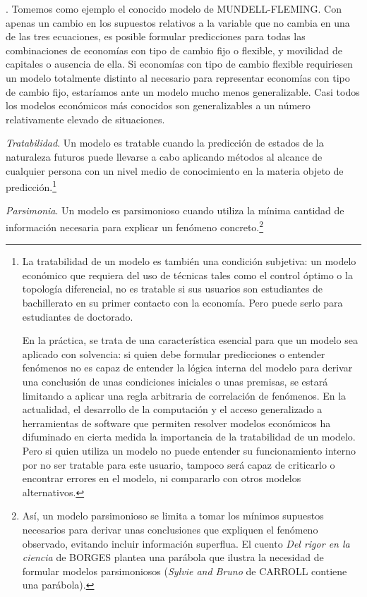 \documentclass[10pt,a4paper]{article}
\newcounter{numitem}
\newenvironment{lnum}
      {\begin{list}{\arabic{numitem}.}{%
          \usecounter{numitem}%
          \setlength{\leftmargin}{1cm}%
          \setlength{\parskip}{3pt}%
          \setlength{\itemsep}{0pt}%
          \setlength{\parsep}{0pt}%
      }}
      {\end{list}}
\begin{document}
\begin{lnum}
{    Tomemos como ejemplo el conocido modelo de MUNDELL-FLEMING. Con apenas un cambio en los supuestos relativos a la variable que no cambia en una de las tres ecuaciones, es posible formular predicciones para todas las combinaciones de economías con tipo de cambio fijo o flexible, y movilidad de capitales o ausencia de ella. Si economías con tipo de cambio flexible requiriesen un modelo totalmente distinto al necesario para representar economías con tipo de cambio fijo, estaríamos ante un modelo mucho menos generalizable. Casi todos los modelos económicos más conocidos son generalizables a un número relativamente elevado de situaciones.
    }
    \item \textit{Tratabilidad}. Un modelo es tratable cuando la predicción de estados de la naturaleza futuros puede llevarse a cabo aplicando métodos al alcance de cualquier persona con un nivel medio de conocimiento en la materia objeto de predicción.\footnote{%
        La tratabilidad de un modelo es también una condición subjetiva: un modelo económico que requiera del uso de técnicas tales como el control óptimo o la topología diferencial, no es tratable si sus usuarios son estudiantes de bachillerato en su primer contacto con la economía. Pero puede serlo para estudiantes de doctorado. 
    
    En la práctica, se trata de una característica esencial para que un modelo sea aplicado con solvencia: si quien debe formular predicciones o entender fenómenos no es capaz de entender la lógica interna del modelo para derivar una conclusión de unas condiciones iniciales o unas premisas, se estará limitando a aplicar una regla arbitraria de correlación de fenómenos. En la actualidad, el desarrollo de la computación y el acceso generalizado a herramientas de software que permiten resolver modelos económicos ha difuminado en cierta medida la importancia de la tratabilidad de un modelo. Pero si quien utiliza un modelo no puede entender su funcionamiento interno por no ser tratable para este usuario, tampoco será capaz de criticarlo o encontrar errores en el modelo, ni compararlo con otros modelos alternativos.
    }
    \item \textit{Parsimonia}. Un modelo es parsimonioso cuando utiliza la mínima cantidad de información necesaria para explicar un fenómeno concreto.\footnote{%
        Así, un modelo parsimonioso se limita a tomar los mínimos supuestos necesarios para derivar unas conclusiones que expliquen el fenómeno observado, evitando incluir información superflua. El cuento \textit{Del rigor en la ciencia} de BORGES plantea una parábola que ilustra la necesidad de formular modelos parsimoniosos (\textit{Sylvie and Bruno} de CARROLL contiene una parábola). 
    
}
\end{lnum}
\end{document}
